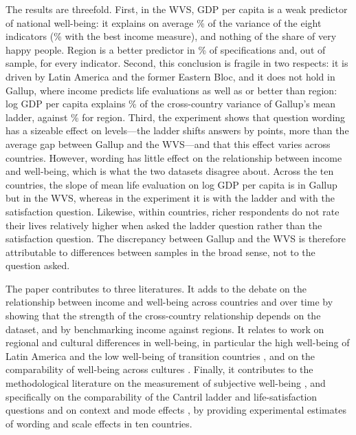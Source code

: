 \documentclass[12pt]{article}
\begin{document}
The results are threefold. First, in the WVS, GDP per capita is a weak predictor of national well-being: it explains on average \meanRtwoIncomePPP\% of the variance of the eight indicators (\meanRtwoIncomeBest\% with the best income measure), and nothing of the share of very happy people. Region is a better predictor in \shareRegionBetterWVS\% of specifications and, out of sample, for every indicator. Second, this conclusion is fragile in two respects: it is driven by Latin America and the former Eastern Bloc, %
and it does not hold in Gallup, where income predicts life evaluations as well as or better than region: log GDP per capita explains \RtwoGallupMeanPPP\% of the cross-country variance of Gallup's mean ladder, against \RtwoGallupRegion\% for region. Third, the experiment shows that question wording has a sizeable effect on levels---the ladder shifts answers by \effectLadder points, more than the average gap between Gallup and the WVS---and that this effect varies across countries. However, wording has little effect on the relationship between income and well-being, which is what the two datasets disagree about. Across the ten countries, the slope of mean life evaluation on log GDP per capita is \slopeTenGallup in Gallup but \slopeTenWVS in the WVS, whereas in the experiment it is \slopeTenFabreLadder with the ladder and \slopeTenFabreSatisfaction with the satisfaction question. Likewise, within countries, richer respondents do not rate their lives relatively higher when asked the ladder question rather than the satisfaction question. The discrepancy between Gallup and the WVS is therefore attributable to differences between samples in the broad sense, not to the question asked.

The paper contributes to three literatures. It adds to the debate on the relationship between income and well-being across countries and over time \citep{easterlin_does_1974,easterlin_happiness_2010,stevenson_economic_2008,deaton_income_2008,jebb_happiness_2018} by showing that the strength of the cross-country relationship depends on the dataset, and by benchmarking income against regions. It relates to work on regional and cultural differences in well-being, in particular the high well-being of Latin America \citep{graham_paradox_2009,rojas_handbook_2016} and the low well-being of transition countries \citep{guriev_unhappiness_2009}, and on the comparability of well-being across cultures \citep{diener_culture_2000,exton_comparing_2015,senik_french_2014}. Finally, it contributes to the methodological literature on the measurement of subjective well-being \citep{kahneman_developments_2006,oecd_guidelines_2013,stone_subjective_2013,bond_sad_2019,kaiser_scientific_2022}, and specifically on the comparability of the Cantril ladder and life-satisfaction questions \citep{bjornskov_how_2010,nilsson_cantril_2024} and on context and mode effects \citep{deaton_understanding_2016,dolan_happy_2016}, by providing experimental estimates of wording and scale effects in ten countries.
\end{document}
